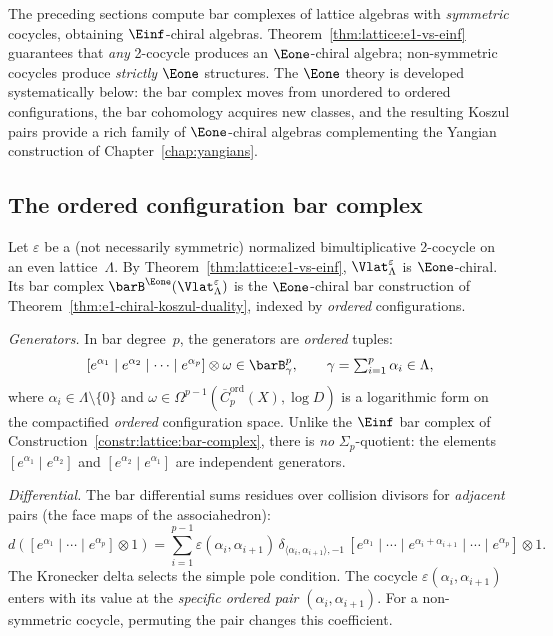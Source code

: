 The preceding sections compute bar complexes of lattice algebras with
\emph{symmetric} cocycles, obtaining $\Einf$-chiral algebras.
Theorem~\ref{thm:lattice:e1-vs-einf} guarantees that \emph{any}
2-cocycle produces an $\Eone$-chiral algebra; non-symmetric cocycles
produce \emph{strictly} $\Eone$ structures. The $\Eone$ theory is developed
systematically below: the bar complex moves from
unordered to ordered configurations, the bar cohomology acquires new
classes, and the resulting Koszul pairs provide a rich family of
$\Eone$-chiral algebras complementing the Yangian construction of
Chapter~\ref{chap:yangians}.



\subsection{The ordered configuration bar complex}

\begin{construction}
\label{constr:lattice:e1-bar}
Let $\varepsilon$ be a (not necessarily symmetric) normalized
bimultiplicative 2-cocycle on an even lattice~$\Lambda$.
By Theorem~\ref{thm:lattice:e1-vs-einf}, $\Vlat_\Lambda^\varepsilon$
is $\Eone$-chiral. Its bar complex
$\barB^{\Eone}(\Vlat_\Lambda^\varepsilon)$ is the $\Eone$-chiral bar
construction of Theorem~\ref{thm:e1-chiral-koszul-duality}, indexed by
\emph{ordered} configurations.

\noindent\emph{Generators.} In bar degree~$p$, the generators are
\emph{ordered} tuples:
\[
[e^{\alpha_1} \mid e^{\alpha_2} \mid \cdots \mid e^{\alpha_p}]
\otimes \omega \in \barB^p_\gamma,
\qquad
\gamma = \textstyle\sum_{i=1}^p \alpha_i \in \Lambda,
\]
where $\alpha_i \in \Lambda \setminus \{0\}$ and
$\omega \in \Omega^{p-1}(\overline{C}^{\mathrm{ord}}_p(X), \log D)$
is a logarithmic form on the compactified \emph{ordered} configuration
space. Unlike the $\Einf$ bar complex of
Construction~\ref{constr:lattice:bar-complex}, there is \emph{no}
$\Sigma_p$-quotient: the elements $[e^{\alpha_1} \mid e^{\alpha_2}]$
and $[e^{\alpha_2} \mid e^{\alpha_1}]$ are independent generators.

\noindent\emph{Differential.} The bar differential sums residues over
collision divisors for \emph{adjacent} pairs (the face maps of the
associahedron):
\begin{equation}\label{eq:lattice:e1-bar-diff}
d([e^{\alpha_1} \mid \cdots \mid e^{\alpha_p}] \otimes 1)
= \sum_{i=1}^{p-1}
 \varepsilon(\alpha_i, \alpha_{i+1})\,
 \delta_{\langle\alpha_i,\alpha_{i+1}\rangle, -1}\,
 [e^{\alpha_1} \mid \cdots \mid
 e^{\alpha_i + \alpha_{i+1}} \mid \cdots \mid e^{\alpha_p}]
 \otimes 1.
\end{equation}
The Kronecker delta selects the simple pole condition. The cocycle
$\varepsilon(\alpha_i, \alpha_{i+1})$ enters with its value at the
\emph{specific ordered pair} $(\alpha_i, \alpha_{i+1})$. For a
non-symmetric cocycle, permuting the pair changes this coefficient.
\end{construction}

